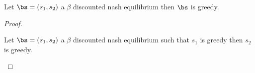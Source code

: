 \begin{myprop}
	Let $\bs = (s_1,s_2)$ a $\beta$ discounted nash equilibrium then $\bs$ is greedy.
\end{myprop}
\begin{proof}
	\begin{mylem}
		Let $\bs = (s_1,s_2)$ a $\beta$ discounted nash equilibrium such that $s_1$ is greedy then $s_2$ is greedy.
	\end{mylem}
\end{proof}





